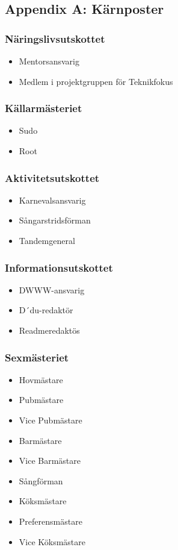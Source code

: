 \documentclass{dsekkallelse}
\begin{document}
\subsection{Appendix A: Kärnposter}
\begin{multicols}{2}

\subsubsection{Näringslivsutskottet}
\begin{itemize}
    \item Mentorsansvarig
    \item Medlem i projektgruppen för Teknikfokus 
\end{itemize}

\subsubsection{Källarmästeriet}
\begin{itemize}
    \item Sudo
    \item Root
\end{itemize}

\subsubsection{Aktivitetsutskottet}
 \begin{itemize}
     \item Karnevalsansvarig
     \item Sångarstridsförman
     \item Tandemgeneral
 \end{itemize}
 
\subsubsection{Informationsutskottet}
\begin{itemize}
    \item DWWW-ansvarig
    \item D´du-redaktör
    \item Readmeredaktös
\end{itemize}
 
 \subsubsection{Sexmästeriet}
\begin{itemize}
    \item Hovmästare
    \item Pubmästare
    \item Vice Pubmästare
    \item Barmästare
    \item Vice Barmästare
    \item Sångförman
    \item Köksmästare
    \item Preferensmästare
    \item Vice Köksmästare
\end{itemize}


\end{multicols}
\end{document}
